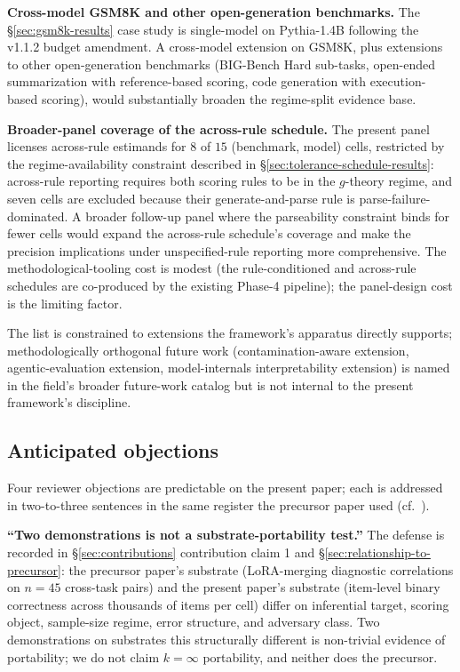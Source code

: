 \documentclass[11pt]{article}
\begin{document}
\textbf{Cross-model GSM8K and other open-generation benchmarks.} The §\ref{sec:gsm8k-results} case study is single-model on Pythia-1.4B following the v1.1.2 budget amendment. A cross-model extension on GSM8K, plus extensions to other open-generation benchmarks (BIG-Bench Hard sub-tasks, open-ended summarization with reference-based scoring, code generation with execution-based scoring), would substantially broaden the regime-split evidence base.

\textbf{Broader-panel coverage of the across-rule schedule.} The present panel licenses across-rule estimands for $8$ of $15$ (benchmark, model) cells, restricted by the regime-availability constraint described in §\ref{sec:tolerance-schedule-results}: across-rule reporting requires both scoring rules to be in the $g$-theory regime, and seven cells are excluded because their generate-and-parse rule is parse-failure-dominated. A broader follow-up panel where the parseability constraint binds for fewer cells would expand the across-rule schedule's coverage and make the precision implications under unspecified-rule reporting more comprehensive. The methodological-tooling cost is modest (the rule-conditioned and across-rule schedules are co-produced by the existing Phase-4 pipeline); the panel-design cost is the limiting factor.

The list is constrained to extensions the framework's apparatus directly supports; methodologically orthogonal future work (contamination-aware extension, agentic-evaluation extension, model-internals interpretability extension) is named in the field's broader future-work catalog but is not internal to the present framework's discipline.

\subsection{Anticipated objections}
\label{sec:anticipated-objections}

Four reviewer objections are predictable on the present paper; each is addressed in two-to-three sentences in the same register the precursor paper used (cf.~\citet{anonymized2026n134}).

\textbf{``Two demonstrations is not a substrate-portability test.''} The defense is recorded in §\ref{sec:contributions} contribution claim 1 and §\ref{sec:relationship-to-precursor}: the precursor paper's substrate (LoRA-merging diagnostic correlations on $n = 45$ cross-task pairs) and the present paper's substrate (item-level binary correctness across thousands of items per cell) differ on inferential target, scoring object, sample-size regime, error structure, and adversary class. Two demonstrations on substrates this structurally different is non-trivial evidence of portability; we do not claim $k = \infty$ portability, and neither does the precursor.
\end{document}
